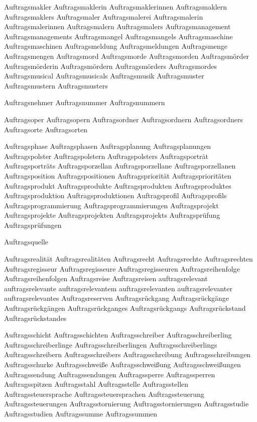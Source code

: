 Auftragsmakler
Auftragsmaklerin
Auftragsmaklerinnen
Auftragsmaklern
Auftragsmaklers
Auftragsmaler
Auftragsmalerei
Auftragsmalerin
Auftragsmalerinnen
Auftragsmalern
Auftragsmalers
Auftragsmanagement
Auftragsmanagements
Auftragsmangel
Auftragsmangels
Auftragsmaschine
Auftragsmaschinen
Auftragsmeldung
Auftragsmeldungen
Auftragsmenge
Auftragsmengen
Auftragsmord
Auftragsmorde
Auftragsmorden
Auftragsmörder
Auftragsmörderin
Auftragsmördern
Auftragsmörders
Auftragsmordes
Auftragsmusical
Auftragsmusicals
Auftragsmusik
Auftragsmuster
Auftragsmustern
Auftragsmusters

Auftragsnehmer
Auftragsnummer
Auftragsnummern

Auftragsoper
Auftragsopern
Auftragsordner
Auftragsordnern
Auftragsordners
Auftragsorte
Auftragsorten

Auftragsphase
Auftragsphasen
Auftragsplanung
Auftragsplanungen
Auftragspolster
Auftragspolstern
Auftragspolsters
Auftragsporträt
Auftragsporträts
Auftragsporzellan
Auftragsporzellane
Auftragsporzellanen
Auftragsposition
Auftragspositionen
Auftragspriorität
Auftragsprioritäten
Auftragsprodukt
Auftragsprodukte
Auftragsprodukten
Auftragsproduktes
Auftragsproduktion
Auftragsproduktionen
Auftragsprofil
Auftragsprofils
Auftragsprogrammierung
Auftragsprogrammierungen
Auftragsprojekt
Auftragsprojekte
Auftragsprojekten
Auftragsprojekts
Auftragsprüfung
Auftragsprüfungen

Auftragsquelle

Auftragsrealität
Auftragsrealitäten
Auftragsrecht
Auftragsrechte
Auftragsrechten
Auftragsregisseur
Auftragsregisseure
Auftragsregisseuren
Auftragsreihenfolge
Auftragsreihenfolgen
Auftragsreise
Auftragsreisen
auftragsrelevant
auftragsrelevante
auftragsrelevantem
auftragsrelevanten
auftragsrelevanter
auftragsrelevantes
Auftragsreserven
Auftragsrückgang
Auftragsrückgänge
Auftragsrückgängen
Auftragsrückganges
Auftragsrückgangs
Auftragsrückstand
Auftragsrückstandes

Auftragsschicht
Auftragsschichten
Auftragsschreiber
Auftragsschreiberling
Auftragsschreiberlinge
Auftragsschreiberlingen
Auftragsschreiberlings
Auftragsschreibern
Auftragsschreibers
Auftragsschreibung
Auftragsschreibungen
Auftragsschurke
Auftragsschweiße
Auftragsschweißung
Auftragsschweißungen
Auftragssendung
Auftragssendungen
Auftragssperre
Auftragssperren
Auftragsspitzen
Auftragsstahl
Auftragsstelle
Auftragsstellen
Auftragssteuersprache
Auftragssteuersprachen
Auftragssteuerung
Auftragssteuerungen
Auftragsstornierung
Auftragsstornierungen
Auftragsstudie
Auftragsstudien
Auftragssumme
Auftragssummen

